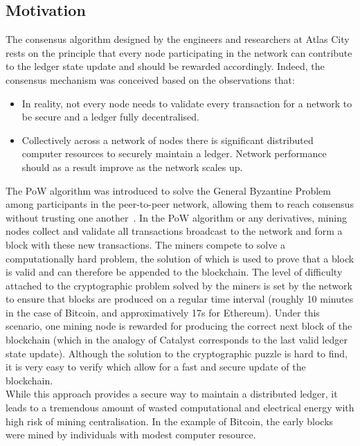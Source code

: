 \subsection{Motivation}
The consensus algorithm designed by the engineers and researchers at Atlas City rests on the principle that every node participating in the network can contribute to the ledger state update and should be rewarded accordingly. Indeed, the consensus mechanism was conceived based on the observations that: 
\begin{itemize}
\item In reality, not every node needs to validate every transaction for a network to be secure and a ledger fully decentralised. 
\item Collectively across a network of nodes there is significant distributed computer resources to securely maintain a ledger. Network performance should as a result improve as the network scales up.
\end{itemize}

The PoW algorithm was introduced to solve the General Byzantine Problem among participants in the peer-to-peer network, allowing them to reach consensus without trusting one another~\cite{BFT}. In the PoW algorithm or any derivatives, mining nodes collect and validate all transactions broadcast to the network and form a block with these new transactions. The miners compete to solve a computationally hard problem, the solution of which is used to prove that a block is valid and can therefore be appended to the blockchain. The level of difficulty attached to the cryptographic problem solved by the miners is set by the network to ensure that blocks are produced on a regular time interval (roughly 10 minutes in the case of Bitcoin, and approximatively 17s for Ethereum). Under this scenario, one mining node is rewarded for producing the correct next block of the blockchain (which in the analogy of Catalyst corresponds to the last valid ledger state update). Although the solution to the cryptographic puzzle is hard to find, it is very easy to verify which allow for a fast and secure update of the blockchain.  \\

While this approach provides a secure way to maintain a distributed ledger, it leads to a tremendous amount of wasted computational and electrical energy with high risk of mining centralisation. In the example of Bitcoin, the early blocks were mined by individuals with modest computer resource. 

